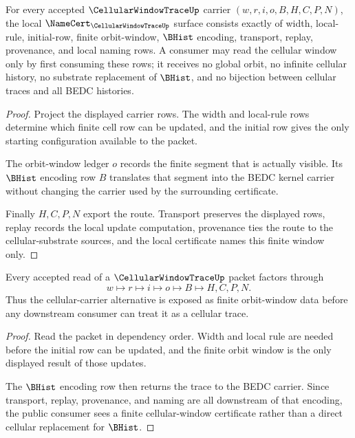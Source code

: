 \begin{theorem}\label{thm:cellular-window-trace-namecert-obligations}
For every accepted $\CellularWindowTraceUp$ carrier $(w,r,i,o,B,H,C,P,N)$, the local $\NameCert_{\CellularWindowTraceUp}$ surface consists exactly of width, local-rule, initial-row, finite orbit-window, $\BHist$ encoding, transport, replay, provenance, and local naming rows. A consumer may read the cellular window only by first consuming these rows; it receives no global orbit, no infinite cellular history, no substrate replacement of $\BHist$, and no bijection between cellular traces and all BEDC histories.
\end{theorem}
\begin{proof}
Project the displayed carrier rows. The width and local-rule rows determine which finite cell row can be updated, and the initial row gives the only starting configuration available to the packet.

The orbit-window ledger $o$ records the finite segment that is actually visible. Its $\BHist$ encoding row $B$ translates that segment into the BEDC kernel carrier without changing the carrier used by the surrounding certificate.

Finally $H,C,P,N$ export the route. Transport preserves the displayed rows, replay records the local update computation, provenance ties the route to the cellular-substrate sources, and the local certificate names this finite window only.
\end{proof}

\begin{theorem}\label{thm:cellular-window-trace-finite-read-factorization}
Every accepted read of a $\CellularWindowTraceUp$ packet factors through
$$
w\longmapsto r\longmapsto i\longmapsto o\longmapsto B\longmapsto H,C,P,N .
$$
Thus the cellular-carrier alternative is exposed as finite orbit-window data before any downstream consumer can treat it as a cellular trace.
\end{theorem}
\begin{proof}
Read the packet in dependency order. Width and local rule are needed before the initial row can be updated, and the finite orbit window is the only displayed result of those updates.

The $\BHist$ encoding row then returns the trace to the BEDC carrier. Since transport, replay, provenance, and naming are all downstream of that encoding, the public consumer sees a finite cellular-window certificate rather than a direct cellular replacement for $\BHist$.
\end{proof}

